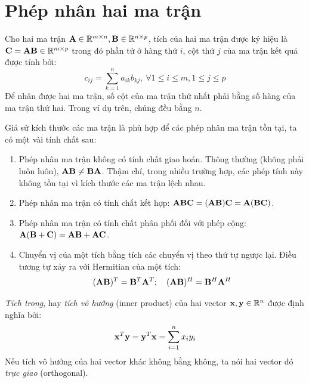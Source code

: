 \section{Phép nhân hai ma trận} %
\label{sec:nhan_hai_ma_tran}
Cho hai ma trận $\mathbf{A} \in \mathbb{R}^{m\times n}, \mathbf{B} \in \mathbb{R}^{n \times p}$, tích của hai
ma trận được ký hiệu là $\mathbf{C} = \mathbf{A}\mathbf{B} \in \mathbb{R}^{m \times p}$ trong đó phần tử ở
hàng thứ $i$, cột thứ $j$ của ma trận kết quả được tính bởi:
\begin{equation}
c_{ij} = \sum_{k=1}^na_{ik}b_{kj}, ~\forall 1\leq i \leq m, 1 \leq j \leq p
\end{equation}
Để nhân được hai ma trận, số cột của ma trận thứ nhất phải bằng số hàng của ma trận thứ hai. Trong ví dụ trên, chúng đều bằng $n$.

Giả sử kích thước các ma trận là phù hợp để các phép nhân ma trận tồn tại, ta có
một vài tính chất sau:

\begin{enumerate}

\item Phép nhân ma trận không có tính chất giao hoán. Thông thường (không
phải luôn luôn), $\mathbf{A}\mathbf{B} \neq \mathbf{B}\mathbf{A}$. Thậm chí, trong nhiều trường hợp, các
phép tính này không tồn tại vì kích thước các ma trận lệch nhau.

\item Phép nhân ma trận có tính chất kết hợp: $\mathbf{A} \mathbf{B}\mathbf{C} = (\mathbf{A}\mathbf{B})\mathbf{C} = \mathbf{A}(\mathbf{B}\mathbf{C})$.

\item Phép nhân ma trận có tính chất phân phối đối với phép cộng: $\mathbf{A}(\mathbf{B} + \mathbf{C}) = \mathbf{A}\mathbf{B} + \mathbf{A}\mathbf{C}$.

\item Chuyển vị của một tích bằng tích các chuyển vị theo thứ tự ngược lại.
Điều tương tự xảy ra với Hermitian của một tích:
\begin{equation}
(\mathbf{A}\mathbf{B})^T = \mathbf{B}^T \mathbf{A}^T; \quad (\mathbf{A}\mathbf{B})^H = \mathbf{B}^H\mathbf{A}^H
\end{equation}

\end{enumerate}
\textit{Tích trong}, hay \textit{tích vô hướng} (inner product) của hai vector $\mathbf{x}, \mathbf{y} \in \mathbb{R}^n$
được định nghĩa bởi:
\begin{equation}
\mathbf{x}^T\mathbf{y} = \mathbf{y}^T\mathbf{x} = \sum_{i =1}^n x_iy_i
\end{equation}
Nếu tích vô hướng của hai vector khác không bằng không, ta nói hai vector đó
\textit{trực giao} (orthogonal).

